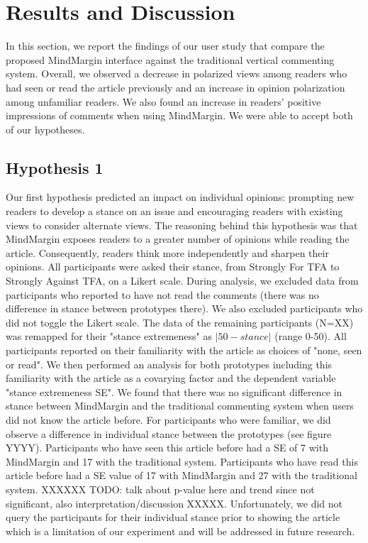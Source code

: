 \section{Results and Discussion}

In this section, we report the findings of our user study that compare the proposed MindMargin interface against the traditional vertical commenting system. Overall, we observed a decrease in polarized views among readers who had seen or read the article previously and an increase in opinion polarization among unfamiliar readers. We also found an increase in readers' positive impressions of comments when using MindMargin. We were able to accept both of our hypotheses.

\subsection{Hypothesis 1}
Our first hypothesis predicted an impact on individual opinions: prompting new readers to develop a stance on an issue and encouraging readers with existing views to consider alternate views. The reasoning behind this hypothesis was that MindMargin exposes readers to a greater number of opinions while reading the article. Consequently, readers think more independently and sharpen their opinions. All participants were asked their stance, from Strongly For TFA to Strongly Against TFA, on a Likert scale. During analysis, we excluded data from participants who reported to have not read the comments (there was no difference in stance between prototypes there). We also excluded participants who did not toggle the Likert scale. The data of the remaining participants (N=XX) was remapped for their "stance extremeness" as $|50 - stance|$ (range 0-50). All participants reported on their familiarity with the article as choices of "none, seen or read". We then performed an analysis for both prototypes including this familiarity with the article as a covarying factor and the dependent variable "stance extremeness SE". We found that there was no significant difference in stance between MindMargin and the traditional commenting system when users did not know the article before. For participants who were familiar, we did observe a difference in individual stance between the prototypes (see figure YYYY). Participants who have seen this article before had a SE of 7 with MindMargin and 17 with the traditional system. Participants who have read this article before had a SE value of 17 with MindMargin and 27 with the traditional system. XXXXXX TODO: talk about p-value here and trend since not significant, also interpretation/discussion XXXXX. Unfortunately, we did not query the participants for their individual stance prior to showing the article which is a limitation of our experiment and will be addressed in future research.



